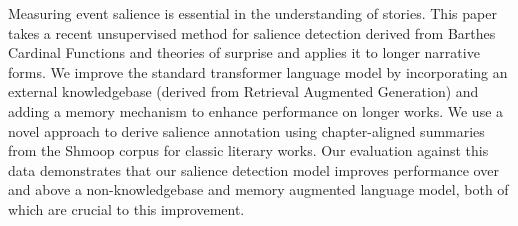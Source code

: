Measuring event salience is essential in the understanding of stories. This paper takes a recent unsupervised method for salience detection derived from Barthes Cardinal Functions and theories of surprise and applies it to longer narrative forms. We improve the standard transformer language model by incorporating an external knowledgebase (derived from Retrieval Augmented Generation) and adding a memory mechanism to enhance performance on longer works. We use a novel approach to derive salience annotation using chapter-aligned summaries from the Shmoop corpus for classic literary works.  Our evaluation against this data demonstrates that our salience detection model improves performance over and above a non-knowledgebase and memory augmented language model, both of which are crucial to this improvement.

